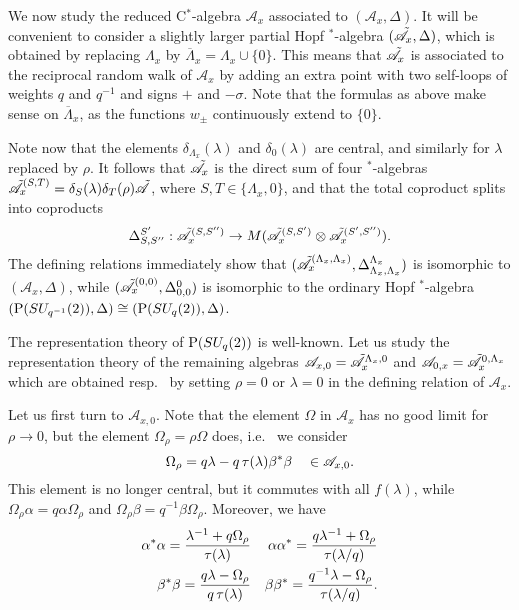 We now study the reduced C$^*$-algebra $\mathcal{A}_x$ associated to $(\mathscr{A}_x,\Delta)$. It will be convenient to consider a slightly larger partial Hopf $^*$-algebra $(\tilde{\mathscr{A}}_x,\Delta)$, which is obtained by replacing $\Lambda_x$ by $\overline{\Lambda}_x = \Lambda_x\cup \{0\}$. This means that $\tilde{\mathscr{A}}_x$ is associated to the reciprocal random walk of $\mathscr{A}_x$ by adding an extra point with two self-loops of weights $q$ and $q^{-1}$ and signs $+$ and $-\sigma$. Note that the formulas as above make sense on $\overline{\Lambda}_x$, as the functions $w_{\pm}$ continuously extend to $\{0\}$. 

Note now that the elements $\delta_{\Lambda_x}(\lambda)$ and $\delta_0(\lambda)$ are central, and similarly for $\lambda$ replaced by $\rho$. It follows that $\tilde{\mathscr{A}}_x$ is the direct sum of four $^*$-algebras $\tilde{\mathscr{A}}_x^{(S,T)} = \delta_{S}(\lambda)\delta_T(\rho)\tilde{\mathscr{A}}$, where $S,T\in \{\Lambda_x,0\}$, and that the total coproduct splits into coproducts \[\Delta_{S,S''}^{S'}:\tilde{\mathscr{A}}_x^{(S,S'')} \rightarrow M(\tilde{\mathscr{A}}_x^{(S,S')}\otimes \tilde{\mathscr{A}}_x^{(S',S'')}).\] The defining relations immediately show that $(\tilde{\mathscr{A}}_x^{(\Lambda_x,\Lambda_x)},\Delta_{\Lambda_x,\Lambda_x}^{\Lambda_x})$ is isomorphic to $(\mathscr{A}_x,\Delta)$, while $(\tilde{\mathscr{A}}_x^{(0,0)},\Delta_{0,0}^0)$ is isomorphic to the ordinary Hopf $^*$-algebra $(\operatorname{\mathrm{P}}(SU_{q^{-1}}(2)),\Delta) \cong (\operatorname{\mathrm{P}}(SU_q(2)),\Delta)$.

The representation theory of $\operatorname{\mathrm{P}}(SU_q(2))$ is well-known. Let us study the representation theory of the remaining algebras $\mathscr{A}_{x,0} = \tilde{\mathscr{A}}_x^{\Lambda_x,0}$ and $\mathscr{A}_{0,x} = \tilde{\mathscr{A}}_x^{0,\Lambda_x}$ which are obtained resp.~ by setting $\rho=0$ or $\lambda = 0$ in the defining relation of $\mathscr{A}_x$. 

Let us first turn to $\mathscr{A}_{x,0}$. Note that the element $\Omega$ in $\mathscr{A}_x$ has no good limit for $\rho \rightarrow 0$, but the element $\Omega_{\rho} = \rho \Omega$ does, i.e.~ we consider \[\Omega_{\rho} =  q\lambda - q\operatorname{\tau}(\lambda)\beta^*\beta \quad \in \mathscr{A}_{x,0}.\] This element is no longer central, but it commutes with all $f(\lambda)$, while $\Omega_{\rho}\alpha = q\alpha \Omega_{\rho}$ and $\Omega_{\rho}\beta = q^{-1}\beta \Omega_{\rho}$. Moreover, we have \begin{align*} 
\alpha^*\alpha = \frac{\lambda^{-1}+q\Omega_{\rho}}{\operatorname{\tau}(\lambda)} && \alpha\alpha^* = \frac{q\lambda^{-1}+\Omega_{\rho}}{\operatorname{\tau}(\lambda/q)}\\ 
\beta^*\beta = \frac{q\lambda-\Omega_{\rho}}{q\operatorname{\tau}(\lambda)}&& \beta\beta^* =  \frac{q^{-1}\lambda-\Omega_{\rho}}{\operatorname{\tau}(\lambda/q)}.
\end{align*} 

